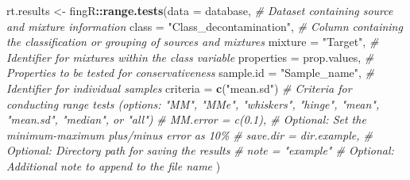 \documentclass[
]{article}
\newenvironment{Shaded}{\begin{snugshade}}{\end{snugshade}}
\newcommand{\AttributeTok}[1]{\textcolor[rgb]{0.13,0.29,0.53}{#1}}
\newcommand{\CommentTok}[1]{\textcolor[rgb]{0.56,0.35,0.01}{\textit{#1}}}
\newcommand{\FunctionTok}[1]{\textcolor[rgb]{0.13,0.29,0.53}{\textbf{#1}}}
\newcommand{\NormalTok}[1]{#1}
\newcommand{\OtherTok}[1]{\textcolor[rgb]{0.56,0.35,0.01}{#1}}
\newcommand{\SpecialCharTok}[1]{\textcolor[rgb]{0.81,0.36,0.00}{\textbf{#1}}}
\newcommand{\StringTok}[1]{\textcolor[rgb]{0.31,0.60,0.02}{#1}}
\begin{document}
\begin{Shaded}
\begin{Highlighting}[]
\NormalTok{rt.results }\OtherTok{\textless{}{-}}\NormalTok{ fingR}\SpecialCharTok{::}\FunctionTok{range.tests}\NormalTok{(}\AttributeTok{data =}\NormalTok{ database,                 }\CommentTok{\# Dataset containing source and mixture information}
                                 \AttributeTok{class =} \StringTok{"Class\_decontamination"}\NormalTok{, }\CommentTok{\# Column containing the classification or grouping of sources and mixtures}
                                 \AttributeTok{mixture =} \StringTok{"Target"}\NormalTok{,              }\CommentTok{\# Identifier for mixtures within the class variable}
                                 \AttributeTok{properties =}\NormalTok{ prop.values,        }\CommentTok{\# Properties to be tested for conservativeness}
                                 \AttributeTok{sample.id =} \StringTok{"Sample\_name"}\NormalTok{,       }\CommentTok{\# Identifier for individual samples}
                                 \AttributeTok{criteria =} \FunctionTok{c}\NormalTok{(}\StringTok{"mean.sd"}\NormalTok{)          }\CommentTok{\# Criteria for conducting range tests (options: "MM", "MMe", "whiskers", "hinge", "mean", "mean.sd", "median", or "all")}
                                 \CommentTok{\# MM.error = c(0.1),             \# Optional: Set the minimum{-}maximum plus/minus error as 10\%}
                                 \CommentTok{\# save.dir = dir.example,        \# Optional: Directory path for saving the results}
                                 \CommentTok{\# note = "example"               \# Optional: Additional note to append to the file name}
\NormalTok{                                 )}
\end{Highlighting}
\end{Shaded}
\end{document}

